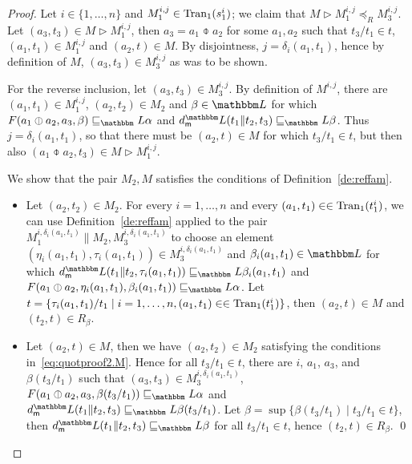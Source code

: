 \documentclass[twocolumn]{svjour3-dummy}
\newcommand*\labpre{\preccurlyeq}
\newcommand*\Tran{\textup{\textrm{Tran}}}
\newcommand*\by{/}
\newcommand*\LL{\mathbbm L}
\begin{document}
\begin{proof}
  Let $i\in\{ 1,\dots, n\}$ and $M_1^{ i, j}\in \Tran_1( s_1^i)$; we
  claim that $M\triangleright M_1^{ i, j}\labpre_R M_3^{ i, j}$.  Let $(
  a_3, t_3)\in M\triangleright M_1^{ i, j}$, then $a_3= a_1\obar a_2$
  for some $a_1, a_2$ such that $t_3\by t_1\in t$, $( a_1, t_1)\in M_1^{
    i, j}$ and $( a_2, t)\in M$.  By disjointness, $j= \delta_i( a_1,
  t_1)$, hence by definition of $M$, $( a_3, t_3)\in M_3^{ i, j}$ as was
  to be shown.

  For the reverse inclusion, let $( a_3, t_3)\in M_3^{ i, j}$.  By
  definition of $M^{ i, j}$, there are $( a_1, t_1)\in M_1^{ i, j}$, $(
  a_2, t_2)\in M_2$ and $\beta\in \LL$ for which $F( a_1\obar a_2, a_3,
  \beta)\sqsubseteq_\LL \alpha$ and $\mdl( t_1\| t_2,
  t_3)\sqsubseteq_\LL \beta$.  Thus $j= \delta_i( a_1, t_1)$, so that
  there must be $( a_2, t)\in M$ for which $t_3\by t_1\in t$, but then
  also $( a_1\obar a_2, t_3)\in M\triangleright M_1^{ i, j}$.

  We show that the pair $M_2, M$ satisfies the conditions of
  Definition~\ref{de:reffam}.
  \begin{itemize}
  \item Let $( a_2, t_2)\in M_2$.  For every $i= 1,\dotsc, n$ and every
    $( a_1, t_1)\in \in \Tran_1( t_1^i)$, we can use
    Definition~\ref{de:reffam} applied to the pair $M_1^{ i, \delta_i(
      a_1, t_1)}\| M_2, M_3^{ i, \delta_i( a_1, t_1)}$ to choose an
    element $( \eta_i( a_1, t_1), \tau_i( a_1, t_1))\in M_3^{ i,
      \delta_i( a_1, t_1)}$ and $\beta_i( a_1, t_1)\in \LL$ for which
    $\mdl( t_1\| t_2, \tau_i(a_1, t_1))\sqsubseteq_\LL \beta_i( a_1,
    t_1)$ and $F( a_1\obar a_2, \eta_i( a_1, t_1), \beta_i( a_1,
    t_1))\sqsubseteq_\LL \alpha$.  Let $t=\{ \tau_i( a_1, t_1)\by
    t_1\mid i= 1,\dotsc, n,( a_1, t_1)\in \in \Tran_1( t_1^i)\}$, then
    $( a_2, t)\in M$ and $( t_2, t)\in R_\beta$.
  \item Let $( a_2, t)\in M$, then we have $( a_2, t_2)\in M_2$
    satisfying the conditions in~\eqref{eq:quotproof2.M}.  Hence for all
    $t_3\by t_1\in t$, there are $i$, $a_1$, $a_3$, and $\beta( t_3\by
    t_1)$ such that $( a_3, t_3)\in M_3^{ i, \delta_i( a_1, t_1)}$, $F(
    a_1\obar a_2, a_3, \beta( t_3\by t_1))\sqsubseteq_\LL \alpha$
    and\linebreak[4]$\mdl( t_1\| t_2, t_3)\sqsubseteq_\LL \beta( t_3\by t_1)$.  Let
    $\beta= \sup\{ \beta( t_3\by t_1)\mid t_3\by t_1\in t\}$, then
    $\mdl( t_1\| t_2, t_3)\sqsubseteq_\LL \beta$ for all $t_3\by t_1\in
    t$, hence $( t_2, t)\in R_\beta$. \qed
  \end{itemize}
\end{proof}
\end{document}
